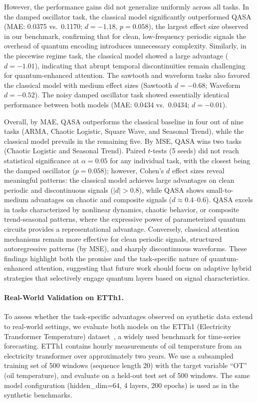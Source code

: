 \documentclass[conference]{IEEEtran}
\begin{document}
However, the performance gains did not generalize uniformly across all tasks. In the damped oscillator task, the classical model significantly outperformed QASA (MAE: 0.0375 vs.\ 0.1170; $d = -1.18$, $p = 0.058$), the largest effect size observed in our benchmark, confirming that for clean, low-frequency periodic signals the overhead of quantum encoding introduces unnecessary complexity. Similarly, in the piecewise regime task, the classical model showed a large advantage ($d = -1.01$), indicating that abrupt temporal discontinuities remain challenging for quantum-enhanced attention. The sawtooth and waveform tasks also favored the classical model with medium effect sizes (Sawtooth $d = -0.68$; Waveform $d = -0.52$). The noisy damped oscillator task showed essentially identical performance between both models (MAE: 0.0434 vs.\ 0.0434; $d = -0.01$).

Overall, by MAE, QASA outperforms the classical baseline in four out of nine tasks (ARMA, Chaotic Logistic, Square Wave, and Seasonal Trend), while the classical model prevails in the remaining five. By MSE, QASA wins two tasks (Chaotic Logistic and Seasonal Trend). Paired $t$-tests (5 seeds) did not reach statistical significance at $\alpha = 0.05$ for any individual task, with the closest being the damped oscillator ($p = 0.058$); however, Cohen's $d$ effect sizes reveal meaningful patterns: the classical model achieves large advantages on clean periodic and discontinuous signals ($|d| > 0.8$), while QASA shows small-to-medium advantages on chaotic and composite signals ($d \approx 0.4$--$0.6$). QASA excels in tasks characterized by nonlinear dynamics, chaotic behavior, or composite trend-seasonal patterns, where the expressive power of parameterized quantum circuits provides a representational advantage. Conversely, classical attention mechanisms remain more effective for clean periodic signals, structured autoregressive patterns (by MSE), and sharply discontinuous waveforms. These findings highlight both the promise and the task-specific nature of quantum-enhanced attention, suggesting that future work should focus on adaptive hybrid strategies that selectively engage quantum layers based on signal characteristics.

\paragraph{Real-World Validation on ETTh1.}
To assess whether the task-specific advantages observed on synthetic data extend to real-world settings, we evaluate both models on the ETTh1 (Electricity Transformer Temperature) dataset~\cite{zhou2021informer}, a widely used benchmark for time-series forecasting. ETTh1 contains hourly measurements of oil temperature from an electricity transformer over approximately two years. We use a subsampled training set of 500 windows (sequence length 20) with the target variable ``OT'' (oil temperature), and evaluate on a held-out test set of 500 windows. The same model configuration (hidden\_dim=64, 4 layers, 200 epochs) is used as in the synthetic benchmarks.
\end{document}
